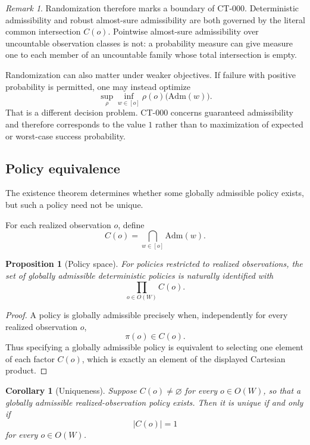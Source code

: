 \documentclass[11pt]{article}
\newtheorem{corollary}[theorem]{Corollary}
\newtheorem{proposition}[theorem]{Proposition}
\theoremstyle{definition}
\theoremstyle{remark}
\newtheorem{remark}[theorem]{Remark}
\newcommand{\worlds}{W}
\newcommand{\admissible}{\mathrm{Adm}}
\begin{document}
\begin{remark}
Randomization therefore marks a boundary of CT-000. Deterministic admissibility
and robust almost-sure admissibility are both governed by the literal
common intersection $C(o)$. Pointwise almost-sure admissibility over
uncountable observation classes is not: a probability measure can give
measure one to each member of an uncountable family whose total intersection
is empty.

Randomization can also matter under weaker objectives. If failure with
positive probability is permitted, one may instead optimize
\[
  \sup_{\rho}
  \inf_{w\in[o]}
  \rho(o)\bigl(\admissible(w)\bigr).
\]
That is a different decision problem. CT-000 concerns guaranteed
admissibility and therefore corresponds to the value $1$ rather than to
maximization of expected or worst-case success probability.
\end{remark}

\subsection{Policy equivalence}

The existence theorem determines whether some globally admissible policy
exists, but such a policy need not be unique.

For each realized observation $o$, define
\[
  C(o)
  =
  \bigcap_{w\in[o]}\admissible(w).
\]

\begin{proposition}[Policy space]
For policies restricted to realized observations, the set of globally
admissible deterministic policies is naturally identified with
\[
  \prod_{o\in O(\worlds)} C(o).
\]
\end{proposition}

\begin{proof}
A policy is globally admissible precisely when, independently for every
realized observation $o$,
\[
  \pi(o)\in C(o).
\]
Thus specifying a globally admissible policy is equivalent to selecting one
element of each factor $C(o)$, which is exactly an element of the displayed
Cartesian product.
\end{proof}

\begin{corollary}[Uniqueness]
Suppose $C(o)\neq\varnothing$ for every $o\in O(\worlds)$, so that a globally
admissible realized-observation policy exists. Then it is unique if and only
if
\[
  |C(o)|=1
\]
for every $o\in O(\worlds)$.
\end{corollary}
\end{document}
